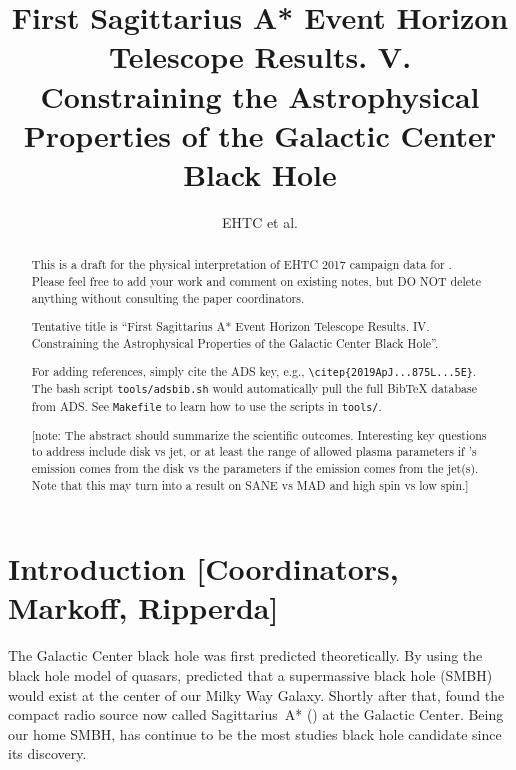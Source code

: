 \documentclass[twocolumn,tighten,dvipsnames,linenumbers]{aastex63}
\newcommand\note[1]{{\color{OliveGreen}[note: #1]}}
\begin{document}
\title{First Sagittarius A* Event Horizon Telescope Results. V.\\
  Constraining the Astrophysical Properties of the Galactic Center Black Hole}
\author{EHTC et al.}



\received{\today}
\revised{\today}

\begin{abstract}
  \color{BrickRed}

  This is a draft for the physical interpretation of EHTC 2017
  campaign data for \sgra.
  Please feel free to add your work and comment on existing notes, but
  DO NOT delete anything without consulting the paper coordinators.

  Tentative title is ``First Sagittarius A* Event Horizon Telescope
  Results. IV. Constraining the Astrophysical Properties of the
  Galactic Center Black Hole''.

  For adding references, simply cite the ADS key, e.g.,
  \texttt{\textbackslash citep\{2019ApJ...875L...5E\}}.
  The bash script \texttt{tools/adsbib.sh} would automatically pull
  the full BibTeX database from ADS.
  See \texttt{Makefile} to learn how to use the scripts in
  \texttt{tools/}.

  \note{The abstract should summarize the scientific outcomes.
    Interesting key questions to address include disk vs jet, or at
    least the range of allowed plasma parameters if \sgra's emission
    comes from the disk vs the parameters if the emission comes from
    the jet(s).
    Note that this may turn into a result on SANE vs MAD and high spin
    vs low spin.}
\end{abstract}


\tableofcontents

\section{Introduction
  [Coordinators, Markoff, Ripperda]}
\label{sec:intro}


The Galactic Center black hole was first predicted theoretically.
By using the black hole model of quasars, \citet{1971MNRAS.152..461L}
predicted that a supermassive black hole (SMBH) would exist at the
center of our Milky Way Galaxy.
Shortly after that, \citet{1974ApJ...194..265B, 1975A&A....43..159E,
  1975ApJ...202L..63L} found the compact radio source now called
Sagittarius~A* (\sgra) at the Galactic Center.
Being our home SMBH, \sgra has continue to be the most studies black
hole candidate since its discovery.
\end{document}
